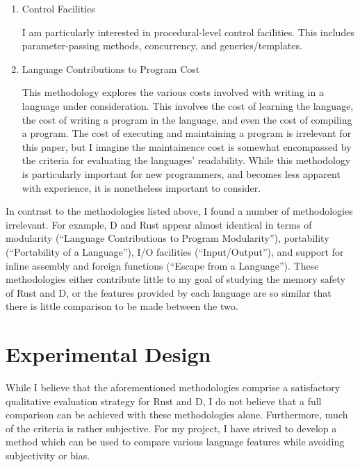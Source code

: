 \documentclass[draftcopy]{srpaper}
\begin{document}
\begin{enumerate}
\item Control Facilities

I am particularly interested in procedural-level control facilities. This
includes parameter-passing methods, concurrency, and generics/templates.

\item Language Contributions to Program Cost

This methodology explores the various costs involved with writing in a language
under consideration. This involves the cost of learning the language, the cost
of writing a program in the language, and even the cost of compiling a program.
The cost of executing and maintaining a program is irrelevant for this paper,
but I imagine the maintainence cost is somewhat encompassed by the criteria for
evaluating the languages' readability. While this methodology is particularly
important for new programmers, and becomes less apparent with experience, it is
nonetheless important to consider.

\end{enumerate}

In contrast to the methodologies listed above, I found a number of
methodologies irrelevant. For example, D and Rust appear almost identical in
terms of modularity (``Language Contributions to Program Modularity''),
portability (``Portability of a Language''), I/O facilities (``Input/Output''),
and support for inline assembly and foreign functions (``Escape from a
Language''). These methodologies either contribute little to my goal of
studying the memory safety of Rust and D, or the features provided by each
language are so similar that there is little comparison to be made between the
two.

\section{Experimental Design}

While I believe that the aforementioned methodologies comprise a satisfactory
qualitative evaluation strategy for Rust and D, I do not believe that a full
comparison can be achieved with these methodologies alone. Furthermore, much of
the criteria is rather subjective. For my project, I have strived to develop a
method which can be used to compare various language features while avoiding
subjectivity or bias.
\end{document}
